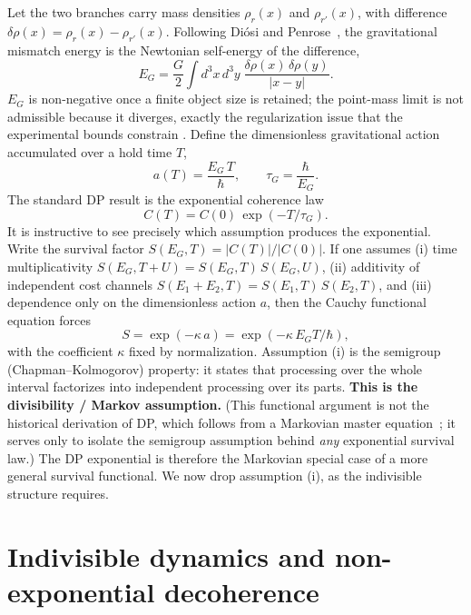 \documentclass[aps,prd,onecolumn,amsmath,amssymb,nofootinbib,superscriptaddress]{revtex4-2}
\begin{document}
Let the two branches carry mass densities $\rho_r(x)$ and $\rho_{r'}(x)$, with difference
$\delta\rho(x)=\rho_r(x)-\rho_{r'}(x)$. Following Di\'osi and Penrose~\cite{R1,R2,R3}, the
gravitational mismatch energy is the Newtonian self-energy of the difference,
\begin{equation}
E_G=\frac{G}{2}\int d^3x\,d^3y\;\frac{\delta\rho(x)\,\delta\rho(y)}{|x-y|}.
\end{equation}
$E_G$ is non-negative once a finite object size is retained; the point-mass limit is not admissible
because it diverges, exactly the regularization issue that the experimental bounds constrain
\cite{R8}. Define the dimensionless gravitational action accumulated over a hold time $T$,
\begin{equation}
a(T)=\frac{E_G\,T}{\hbar},\qquad \tau_G=\frac{\hbar}{E_G}.
\end{equation}
The standard DP result is the exponential coherence law
\begin{equation}
C(T)=C(0)\,\exp(-T/\tau_G).
\end{equation}
It is instructive to see precisely which assumption produces the exponential. Write the survival
factor $S(E_G,T)=|C(T)|/|C(0)|$. If one assumes (i) time multiplicativity $S(E_G,T+U)=S(E_G,T)\,
S(E_G,U)$, (ii) additivity of independent cost channels $S(E_1+E_2,T)=S(E_1,T)\,S(E_2,T)$, and
(iii) dependence only on the dimensionless action $a$, then the Cauchy functional equation forces
\begin{equation}
S=\exp(-\kappa\,a)=\exp(-\kappa\,E_G T/\hbar),
\end{equation}
with the coefficient $\kappa$ fixed by normalization. Assumption (i) is the semigroup
(Chapman--Kolmogorov) property: it states that processing over the whole interval factorizes into
independent processing over its parts. \textbf{This is the divisibility / Markov assumption.} (This
functional argument is not the historical derivation of DP, which follows from a Markovian master
equation~\cite{R2,R20}; it serves only to isolate the semigroup assumption behind \emph{any}
exponential survival law.) The DP exponential is therefore the Markovian special case of a more
general survival functional. We now drop assumption (i), as the indivisible structure requires.

\section{Indivisible dynamics and non-exponential decoherence}\label{sec:indiv}
\end{document}
